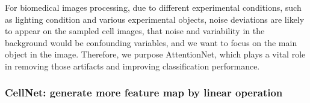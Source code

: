 {For biomedical images processing, due to different experimental conditions, such as lighting condition and various experimental objects, noise deviations are likely to appear on the sampled cell images\cite{6}\cite{7}, that noise and variability in the background would be confounding variables, and we want to focus on the main object in the image. Therefore, we purpose AttentionNet, which plays a vital role in removing those artifacts and improving classification performance.

\subsubsection{CellNet: generate more feature map by linear operation}

}
